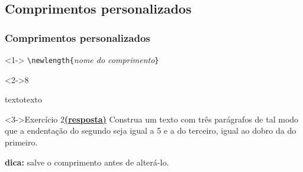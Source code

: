 \documentclass[handout,10pt]{beamer}
\begin{document}
\subsection{Comprimentos personalizados}
\begin{frame}[fragile]
	\frametitle{Comprimentos personalizados}
	
	\begin{block}<1->{}
		\centering
		\verb|\newlength{|\textit{nome do comprimento}\verb|}|
	\end{block}


	\begin{atividade}<2->{8}
		\begin{LaTeXcode}
			\newlength{\meucomp}
			\setlength{\meucomp}{\textwidth minus 0.5\textwidth}
			
			\noindent texto\hspace{\meucomp}texto
		\end{LaTeXcode}
	\end{atividade}
	
	
	\begin{block}<3->{Exercício 2\hyperlink{respostas}{\footnotesize\textbf{(resposta)}}}
		Construa um texto com três parágrafos de tal modo que a endentação do segundo seja igual a \unit{5}{\centi\metre} e a do terceiro, igual ao dobro da do primeiro.
		
		\medskip
		
		\footnotesize\textbf{dica:} salve o comprimento  antes de alterá-lo.
	\end{block}
\end{frame}
\newlength{\mylength}
\end{document}
